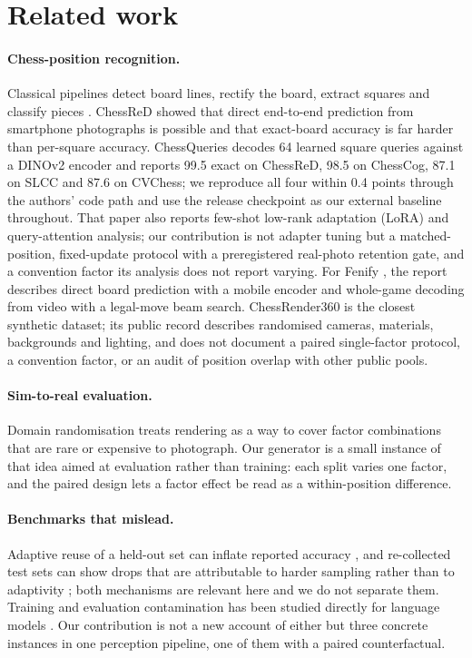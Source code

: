 \section{Related work}
\label{sec:related}

\paragraph{Chess-position recognition.} Classical pipelines detect board lines, rectify the board,
extract squares and classify pieces \cite{chesscog}. ChessReD \cite{chessred} showed that direct
end-to-end prediction from smartphone photographs is possible and that exact-board accuracy is far
harder than per-square accuracy. ChessQueries \cite{chessqueries} decodes 64 learned square queries
against a DINOv2 encoder \cite{dinov2} and reports 99.5 exact on ChessReD, 98.5 on ChessCog, 87.1
on SLCC and 87.6 on CVChess; we reproduce all four within 0.4 points through the authors' code path
and use the release checkpoint as our external baseline throughout. That paper also reports
few-shot low-rank adaptation (LoRA) and query-attention analysis; our contribution is not adapter tuning but a
matched-position, fixed-update protocol with a preregistered real-photo retention gate, and a
convention factor its analysis does not report varying. For Fenify \cite{fenify}, the report describes direct board prediction with a
mobile encoder and whole-game decoding from video with a legal-move beam search. ChessRender360
\cite{cr360} is the closest synthetic dataset; its public record describes randomised cameras,
materials, backgrounds and lighting, and does not document a paired single-factor protocol, a
convention factor, or an audit of position overlap with other public pools.

\paragraph{Sim-to-real evaluation.} Domain randomisation \cite{domainrand} treats rendering as a
way to cover factor combinations that are rare or expensive to photograph. Our generator is a small
instance of that idea aimed at evaluation rather than training: each split varies one factor, and
the paired design lets a factor effect be read as a within-position difference.

\paragraph{Benchmarks that mislead.} Adaptive reuse of a held-out set can inflate reported accuracy
\cite{ladder,holdoutreuse}, and re-collected test sets can show drops that are attributable to harder
sampling rather than to adaptivity \cite{recht2019}; both mechanisms are relevant here and we do not
separate them. Training and evaluation contamination has been studied directly for language models
\cite{oren2023}. Our contribution is not a new account of either but three concrete instances in one
perception pipeline, one of them with a paired counterfactual.

